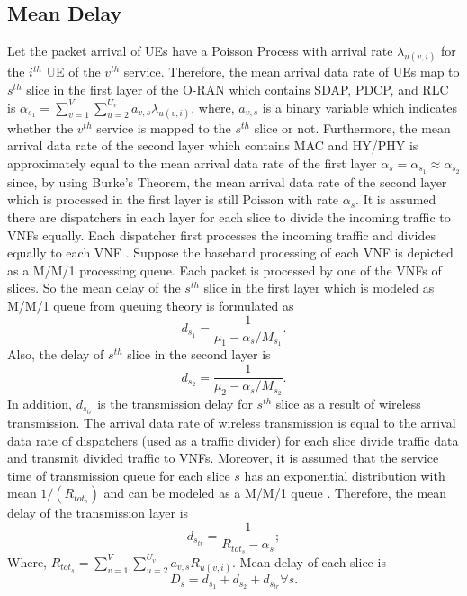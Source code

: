 \documentclass[conference]{IEEEtran}
\begin{document}
\subsection{Mean Delay}
Let the packet arrival of UEs have a Poisson Process with arrival rate $\lambda_{u(v,i)}$ for the $i^{th}$ UE of the $v^{th}$ service. 
Therefore, the mean arrival data rate of UEs map to $s^{th}$ slice in the first layer of the O-RAN which contains SDAP, PDCP, and RLC is 
$\alpha_{s_1} = \sum_{v=1}^{V}\sum_{u=2}^{U_v}a_{v,s}\lambda_{u(v,i)}$, where, $a_{v,s}$ is a binary variable which indicates whether the $v^{th}$ service is mapped to the $s^{th}$ slice or not. 
Furthermore, the mean arrival data rate of the second layer which contains MAC and HY/PHY is approximately equal to the mean arrival data rate of the first layer $\alpha_{s} =\alpha_{s_1} \approx \alpha_{s_2}$ since, by using Burke’s Theorem, the mean arrival data rate of the second layer which is processed in the first layer is still Poisson with rate $\alpha_{s}$. 
It is assumed there are dispatchers in each layer for each slice to divide the incoming traffic to VNFs equally. Each dispatcher first processes the incoming traffic and divides equally to each VNF  \cite{frdl,luong2018novel,luong2018novel1}.
Suppose the baseband processing of each VNF is depicted as a M/M/1 processing queue.
Each packet is processed by one of the VNFs of slices. So the mean delay of the $s^{th}$ slice in the first layer which is modeled as M/M/1 queue from queuing theory is formulated as
\begin{equation}
d_{s_1} = \frac{1}{\mu_1 - \alpha_{s}/{M_{s_1}}}.
\end{equation}
Also, the delay of $s^{th}$ slice in the second layer is
\begin{equation}
d_{s_2} = \frac{1}{\mu_2 - \alpha_{s}/{M_{s_2}}}.
\end{equation}
In addition, $d_{s_{tr}}$ is the transmission delay for $s^{th}$ slice as a result of wireless transmission. The arrival data rate of wireless transmission
 is equal to the arrival data rate of dispatchers (used as a traffic divider) for each slice divide traffic data and transmit divided traffic to VNFs.
Moreover, it is assumed that the service time of transmission queue for each slice $s$ has 
 an exponential distribution with mean $1/(R_{{tot}_s})$ and can be modeled as a M/M/1 queue \cite{frdl,luong2018novel,luong2018novel1}. Therefore, 
the mean delay of the transmission layer is 
\begin{equation}
d_{s_{tr}} = \frac{1}{R_{{tot}_s} - \alpha_{s}};
\end{equation}
Where, $R_{{tot}_s} =  \sum_{v=1}^{V}\sum_{u=2}^{U_v}a_{v,s}R_{u(v,i)}$.
Mean delay of each slice is
\begin{equation}
D_{s} = d_{s_1} + d_{s_2} + d_{s_{tr}} \forall s.
\end{equation} 
\end{document}
